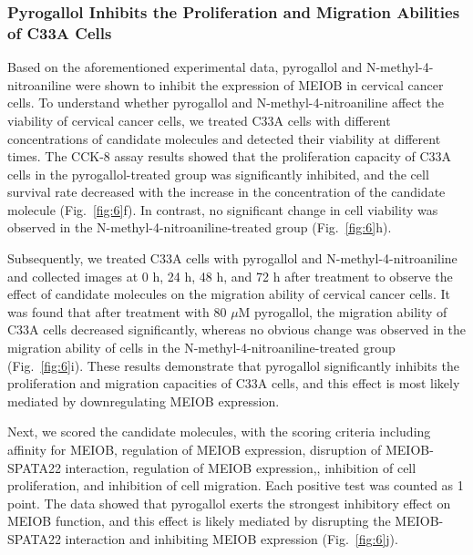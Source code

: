 \documentclass[preprint,12pt]{elsarticle}
\theoremstyle{plain}
\theoremstyle{definition}
\theoremstyle{remark}
\begin{document}
\subsubsection*{Pyrogallol Inhibits the Proliferation and Migration Abilities of C33A Cells}

Based on the aforementioned experimental data, pyrogallol and N-methyl-4-nitroaniline were shown to inhibit the expression of MEIOB in cervical cancer cells. To understand whether pyrogallol and N-methyl-4-nitroaniline affect the viability of cervical cancer cells, we treated C33A cells with different concentrations of candidate molecules and detected their viability at different times. The CCK-8 assay results showed that the proliferation capacity of C33A cells in the pyrogallol-treated group was significantly inhibited, and the cell survival rate decreased with the increase in the concentration of the candidate molecule (Fig.~\ref{fig:6}f). In contrast, no significant change in cell viability was observed in the N-methyl-4-nitroaniline-treated group (Fig.~\ref{fig:6}h).

Subsequently, we treated C33A cells with pyrogallol and N-methyl-4-nitroaniline and collected images at 0 h, 24 h, 48 h, and 72 h after treatment to observe the effect of candidate molecules on the migration ability of cervical cancer cells. It was found that after treatment with 80 $\mu$M pyrogallol, the migration ability of C33A cells decreased significantly, whereas no obvious change was observed in the migration ability of cells in the N-methyl-4-nitroaniline-treated group (Fig.~\ref{fig:6}i). These results demonstrate that pyrogallol significantly inhibits the proliferation and migration capacities of C33A cells, and this effect is most likely mediated by downregulating MEIOB expression.

Next, we scored the candidate molecules, with the scoring criteria including affinity for MEIOB, regulation of MEIOB expression, disruption of MEIOB-SPATA22 interaction, regulation of MEIOB expression,, inhibition of cell proliferation, and inhibition of cell migration. Each positive test was counted as 1 point. The data showed that pyrogallol exerts the strongest inhibitory effect on MEIOB function, and this effect is likely mediated by disrupting the MEIOB-SPATA22 interaction and inhibiting MEIOB expression (Fig.~\ref{fig:6}j).

\end{document}
